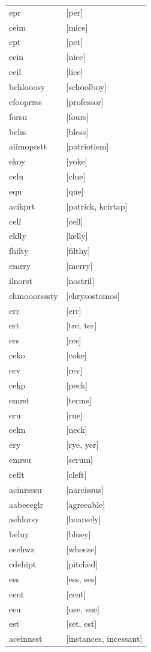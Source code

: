 \documentclass{article}
\begin{document}
\begin{tabular}{ll}
epr & [per] \\
ceim & [mice] \\
ept & [pet] \\
cein & [nice] \\
ceil & [lice] \\
bchlooosy & [schoolboy] \\
efooprrss & [professor] \\
forsu & [fours] \\
belss & [bless] \\
aiimoprstt & [patriotism] \\
ekoy & [yoke] \\
celu & [clue] \\
equ & [que] \\
acikprt & [patrick, kcirtap] \\
cell & [cell] \\
eklly & [kelly] \\
fhilty & [filthy] \\
emrry & [merry] \\
ilnorst & [nostril] \\
chmooorsssty & [chrysostomos] \\
err & [err] \\
ert & [tre, ter] \\
ers & [res] \\
ceko & [coke] \\
erv & [rev] \\
cekp & [peck] \\
emrst & [terms] \\
eru & [rue] \\
cekn & [neck] \\
ery & [rye, yer] \\
emrsu & [serum] \\
ceflt & [cleft] \\
acinrsssu & [narcissus] \\
aabeeeglr & [agreeable] \\
aehlorsy & [hoarsely] \\
beluy & [bluey] \\
eeehwz & [wheeze] \\
cdehipt & [pitched] \\
ess & [ess, ses] \\
cent & [cent] \\
esu & [use, sue] \\
est & [set, est] \\
aceinnsst & [instances, incessant] \\

\end{tabular}
\end{document}
